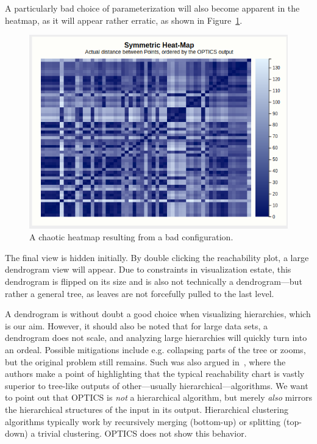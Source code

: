 \documentclass{vgtc} %
\begin{document}
A particularly bad choice of parameterization will also become apparent in the
heatmap, as it will appear rather erratic, as shown in
Figure~\ref{fig:heatmap-bad}.

\begin{figure}[tb]
    \centering
    \includegraphics[width=.9\columnwidth]{heatmap-bad}
    \caption{A chaotic heatmap resulting from a bad configuration.}
    \label{fig:heatmap-bad}
\end{figure}

The final view is hidden initially. By double clicking the reachability plot, a
large dendrogram view will appear. Due to constraints in visualization estate,
this dendrogram is flipped on its size and is also not technically a dendrogram---but
rather a general tree, as leaves are not forcefully pulled to the last level.

A dendrogram is without doubt a good choice when visualizing hierarchies, which
is our aim. However, it should also be noted that for large data sets, a
dendrogram does not scale, and analyzing large hierarchies will quickly turn
into an ordeal. Possible mitigations include e.g. collapsing parts of the tree
or zooms, but the original problem still remains. Such was also argued
in~\cite{optics}, where the authors make a point of highlighting that the
typical reachability chart is vastly superior to tree-like outputs of
other---usually hierarchical---algorithms. We want to point out that OPTICS is
\emph{not} a hierarchical algorithm, but merely \emph{also} mirrors the
hierarchical structures of the input in its output. Hierarchical clustering
algorithms typically work by recursively merging (bottom-up) or splitting
(top-down) a trivial clustering. OPTICS does not show this behavior.
\end{document}
